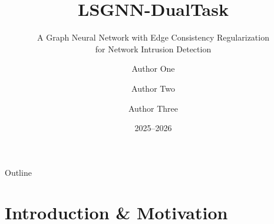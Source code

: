 \documentclass[aspectratio=169, 10pt]{beamer}
\title[LSGNN-DualTask]{LSGNN-DualTask}
\subtitle{A Graph Neural Network with Edge Consistency Regularization\\for Network Intrusion Detection}
\author[Authors]{Author One \and Author Two \and Author Three}
\institute[University]{Department of Computer Science \\ University Placeholder}
\date{2025--2026}
\begin{document}
\begin{frame}
\titlepage
\end{frame}

\begin{frame}{Outline}
\tableofcontents
\end{frame}

\section{Introduction \& Motivation}
\end{document}
